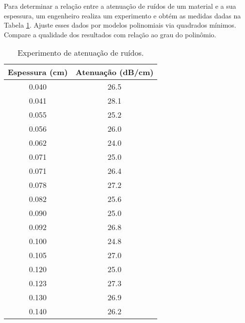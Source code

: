 \begin{problem}
Para determinar a relação entre a atenuação de ruídos de um material e a sua espessura, um engenheiro realiza um experimento e obtém as medidas dadas na Tabela \ref{tab_atenuacao}. Ajuste esses dados por modelos polinomiais via quadrados mínimos. Compare a qualidade dos resultados com relação ao grau do polinômio.

		\begin{table}[tb]
		\begin{center}
		\begin{tabular}{|c||c|}
			\hline
			Espessura (cm) & Atenuação (dB/cm)\\
			\hline
			\hline
0.040 &26.5\\
0.041 &28.1\\
0.055 &25.2\\
0.056 &26.0\\
0.062 &24.0\\
0.071 &25.0\\
0.071 &26.4\\
0.078 &27.2\\
0.082 &25.6\\
0.090 &25.0\\
0.092 &26.8\\
0.100 &24.8\\
0.105 &27.0\\
0.120 &25.0\\
0.123 &27.3\\
0.130 &26.9\\
0.140 &26.2\\
			\hline
		\end{tabular}\\
		\end{center}
		\label{tab_atenuacao}
        \caption{Experimento de atenuação de ruídos.}
		\end{table}
\end{problem}

